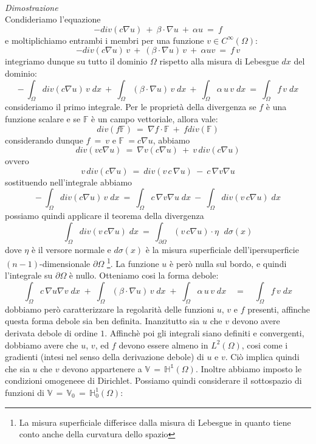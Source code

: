 \documentclass[12pt,a4paper]{report}
\theoremstyle{theorem}
\theoremstyle{theorem}
\theoremstyle{definition}
\begin{document}
\hfill \\
\emph{Dimostrazione}\\
Condideriamo l'equazione
\[ -div(c\nabla{u}) \ + \ \beta \cdot \nabla{u} \ + \ \alpha u \ = \ f \]
e moltiplichiamo entrambi i membri per una funzione $v \in C^{\infty}(\Omega)$:
\[ -div(c\nabla{u}) \, v \ + \ (\beta \cdot \nabla{u}) \, v \ + \ \alpha u v \ = \ f \, v\]
integriamo dunque su tutto il dominio $\Omega$ rispetto alla misura di Lebesgue $dx$ del dominio:
\[ - \ \int_{\Omega}{div(c\nabla{u}) \, v \; dx} \ + \ \int_{\Omega}{(\beta \cdot \nabla{u}) \, v \; dx} \ + \ \int_{\Omega}{\alpha \, u \, v \; dx} \ = \ \int_{\Omega}{f  \, v \; dx}\]
consideriamo il primo integrale. Per le proprietà della divergenza se $f$ è una funzione scalare e se $\mathbb{F}$ è un campo vettoriale, allora vale:
\[ div(f \mathbb{F}) \ = \  \nabla f \cdot \mathbb{F} \ + \ f div(\mathbb{F})\]
considerando dunque $f \ = \ v$ e $\mathbb{F} \ = c \nabla u$, abbiamo
\[ div(v c \nabla u) \ = \  \nabla v (c \nabla u) \ + \ v \, div(c \nabla u)\]
ovvero
\[ v \, div(c \nabla u) \ = \ div(v \, c \, \nabla u) \ - \ c \, \nabla v \nabla u \]
sostituendo nell'integrale abbiamo
\[ - \ \int_{\Omega}{div(c\nabla{u}) \, v \; dx} \ = \ \int_{\Omega}{c \, \nabla v \nabla u \; dx} \ - \ \int_{\Omega}{div(v \, c \nabla u) \; dx}\]
possiamo quindi applicare il teorema della divergenza
\[ \int_{\Omega}{div(v \, c \nabla u) \; dx} \ = \ \int_{\partial \Omega}{ (v \, c \nabla u) \cdot \eta \, \, \; d \sigma (x)}\]
dove $\eta$ è il versore normale e $d \sigma (x) $ è la misura superficiale dell'ipersuperficie $(n-1)$-dimensionale $\partial \Omega $ \footnote{La misura superficiale differisce dalla misura di Lebesgue in quanto tiene conto anche della curvatura dello spazio}. La funzione $u$ è però nulla sul bordo, e quindi l'integrale su $\partial \Omega$ è nullo. Otteniamo cosi la forma debole:
\[ \int_{\Omega}{c \, \nabla u \nabla v \; dx} \; + \; \int_{\Omega}{(\beta \cdot \nabla u) \, v \; dx} \; + \; \int_{\Omega}{\alpha \, u \, v \; dx} \quad = \quad \int_{\Omega}{f \, v \; dx} \]
dobbiamo però caratterizzare la regolarità delle funzioni $u$, $v$ e $f$ presenti, affinche questa forma debole sia ben definita.
Inanzitutto sia $u$ che $v$ devono avere derivata debole di ordine $1$. Affinchè poi gli integrali siano definiti e convergenti, dobbiamo avere che $u$, $v$, ed $f$ devono essere almeno in $L^{2}(\Omega)$, cosi come i gradienti (intesi nel senso della derivazione debole) di $u$ e $v$. Ciò implica quindi che sia $u$ che $v$ devono appartenere a $ \mathbb{V} \, = \, \mathbb{H^1}(\Omega)$. Inoltre abbiamo imposto le condizioni omogeneee di Dirichlet. Possiamo quindi considerare il sottospazio di funzioni di $ \mathbb{V} \, = \, \mathbb{V}_{0} \, = \,\mathbb{H}_{0}^{1}(\Omega)$:  \label{Spazio H01}
\end{document}
